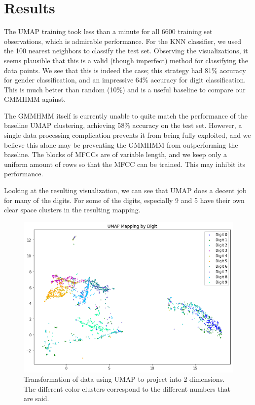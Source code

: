 \documentclass[11pt]{article}
\newcommand{\0}{{\vec  0 }}
\newcommand{\1}{{\mathbbm{  1} }}
\begin{document}
    \section{Results}
    The UMAP training took less than a minute for all 6600 training set observations, which is admirable performance. For the KNN classifier, we used the 100 nearest neighbors to classify the test set. Observing the visualizations, it seems plausible that this is a valid (though imperfect) method for classifying the data points. We see that this is indeed the case; this strategy had 81\% accuracy for gender classification, and an impressive 64\% accuracy for digit classification. This is much better than random (10\%) and is a useful baseline to compare our GMMHMM against. 
    
    The GMMHMM itself is currently unable to quite match the performance of the baseline UMAP clustering, achieving 58\% accuracy on the test set. However, a single data processing complication prevents it from being fully exploited, and we believe this alone may be preventing the GMMHMM from outperforming the baseline. The blocks of MFCCs are of variable length, and we keep only a uniform amount of rows so that the MFCC can be trained. This may inhibit its performance.
    
    Looking at the resulting visualization, we can see that UMAP does a decent job for many of the digits. For some of the digits, especially 9 and 5 have their own clear space clusters in the resulting mapping. 
    
    
    \begin{figure}
        \centering
        \includegraphics[width=0.7\linewidth]{UMAPdigitcomparison}
        \caption{Transformation of data using UMAP to project into 2 dimensions. The different color clusters correspond to the different numbers that are said.}
        \label{fig:umapdigitcomparison}
    \end{figure}
    
\end{document}
